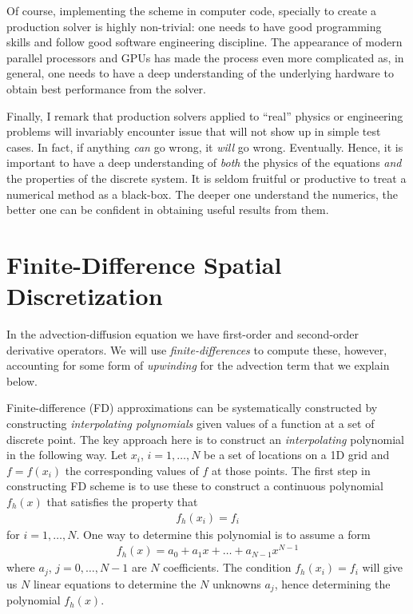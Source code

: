 \documentclass[12pt]{article}
\theoremstyle{definition}
\theoremstyle{definition}
\theoremstyle{definition}
\begin{document}
Of course, implementing the scheme in computer code, specially to
create a production solver is highly non-trivial: one needs to have
good programming skills and follow good software engineering
discipline. The appearance of modern parallel processors and GPUs has
made the process even more complicated as, in general, one needs to
have a deep understanding of the underlying hardware to obtain best
performance from the solver.

Finally, I remark that production solvers applied to ``real'' physics
or engineering problems will invariably encounter issue that will not
show up in simple test cases. In fact, if anything \emph{can} go
wrong, it \emph{will} go wrong. Eventually. Hence, it is important to
have a deep understanding of \emph{both} the physics of the equations
\emph{and} the properties of the discrete system. It is seldom
fruitful or productive to treat a numerical method as a black-box. The
deeper one understand the numerics, the better one can be confident in
obtaining useful results from them.

\section{Finite-Difference Spatial Discretization}

In the advection-diffusion equation we have first-order and
second-order derivative operators. We will use
\emph{finite-differences} to compute these, however, accounting for
some form of \emph{upwinding} for the advection term that we explain
below.

Finite-difference (FD) approximations can be systematically
constructed by constructing \emph{interpolating polynomials} given
values of a function at a set of discrete point. The key approach here
is to construct an \emph{interpolating} polynomial in the following
way. Let $x_i$, $i=1,\ldots,N$ be a set of locations on a 1D grid and
$f = f(x_i)$ the corresponding values of $f$ at those points. The
first step in constructing FD scheme is to use these to construct a
continuous polynomial $f_h(x)$ that satisfies the property that
\begin{align}
  f_h(x_i) = f_i
\end{align}
for $i=1,\ldots,N$. One way to determine this polynomial is to assume
a form
\begin{align}
  f_h(x) = a_0 + a_1 x + \ldots + a_{N-1} x^{N-1}
\end{align}
where $a_j$, $j = 0, \ldots, N-1$ are $N$ coefficients. The condition
$f_h(x_i) = f_i$ will give us $N$ linear equations to determine the
$N$ unknowns $a_j$, hence determining the polynomial $f_h(x)$.
\end{document}
